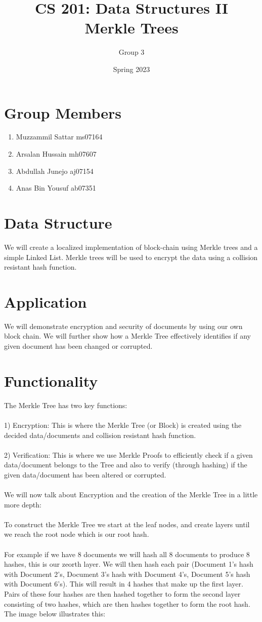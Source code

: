 \documentclass{article}
\title {CS 201: Data Structures II \\Merkle Trees} %
\author{Group 3} %
\date{Spring 2023}
\begin{document}
\maketitle
\section{Group Members}
\begin{enumerate}
  \item Muzzammil Sattar ms07164
  \item Arsalan Hussain mh07607
  \item Abdullah Junejo aj07154
  \item Anas Bin Yousuf ab07351
\end{enumerate}
\section{Data Structure}
We will create a localized implementation of block-chain using Merkle trees and a simple Linked List. 
Merkle trees will be used to encrypt the data using a collision resistant hash function. 
\section{Application}
We will demonstrate encryption and security of documents by using our own block chain. We will further show how a Merkle Tree effectively identifies if any given document has been changed or corrupted.  
\section{Functionality}
The Merkle Tree has two key functions: 
\\\\
1) Encryption: This is where the Merkle Tree (or Block) is created using the decided data/documents and collision resistant hash function.
\\\\
2) Verification: This is where we use Merkle Proofs to efficiently check if a given data/document belongs to the Tree and also to verify (through hashing) if the given data/document has been altered or corrupted.
\\\\
We will now talk about Encryption and the creation of the Merkle Tree in a little more depth:
\\\\
To construct the Merkle Tree we start at the leaf nodes, and create layers until we reach the root node which is our root hash. 
\\\\
For example if we have 8 documents we will hash all 8 documents to produce 8 hashes, this is our zeorth layer. We will then hash each pair (Document 1's hash with Document 2's, Document 3's hash with Document 4's, Document 5's hash with Document 6's). This will result in 4 hashes that make up the first layer. Pairs of these four hashes are then hashed together to form the second layer consisting of two hashes, which are then hashes together to form the root hash. The image below illustrates this:
\end{document}
